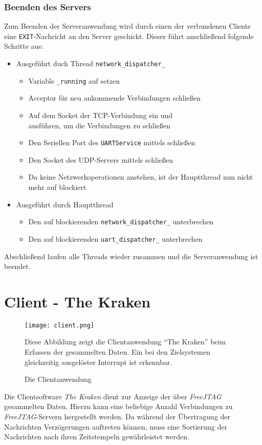 \subsubsection*{Beenden des Servers}
Zum Beenden der Serveranwendung wird durch einen der verbundenen Clients eine
\texttt{EXIT}-Nachricht an den Server geschickt. Dieser führt anschließend
folgende Schritte aus:
\begin{itemize}
  \item Ausgeführt duch Thread \texttt{network\_dispatcher\_}
  \begin{itemize}
  \item Variable \texttt{\_running} auf  setzen
  \item Acceptor für neu ankommende Verbindungen schließen
  \item Auf dem Socket der TCP-Verbindung ein 
  und \\ ausführen, um die Verbindungen zu
  schließen
  \item Den Seriellen Port des \texttt{UARTService} mittels
   schließen
  \item Den Socket des UDP-Servers mittels 
  schließen
  \item Da keine Netzwerkoperationen anstehen, ist der Hauptthread nun nicht
  mehr auf   blockiert
  \end{itemize}\clearpage
  \item Ausgeführt durch Hauptthread
  \begin{itemize}
    \item Den auf  blockierenden
    \texttt{network\_dispatcher\_} unterbrechen
    \item Den auf  blockierenden
    \texttt{uart\_dispatcher\_} unterbrechen
  \end{itemize}
\end{itemize}
Abschließend laufen alle Threads wieder zusammen und die Serveranwendung ist
beendet.

\section{Client - The Kraken}
\begin{figure}[!ht]
\centering
\texttt{[image: client.png]}
\caption{Die Clientanwendung}{Diese Abbildung zeigt die Clientanwendung
"`The Kraken"' beim Erfassen der gesammelten Daten. Ein bei den
Zielsystemen gleichzeitig ausgelöster Interrupt ist erkennbar.}
\label{fig:client}
\end{figure}
Die Clientsoftware \emph{The Kraken} dient zur Anzeige der über \emph{FreeJTAG}
gesammelten Daten. Hierzu kann eine beliebige Anzahl Verbindungen zu
\emph{FreeJTAG}-Servern hergestellt werden. Da während der Übertragung der
Nachrichten Verzögerungen auftreten können, muss eine Sortierung der Nachrichten
nach ihren Zeitstempeln gewährleistet werden.
